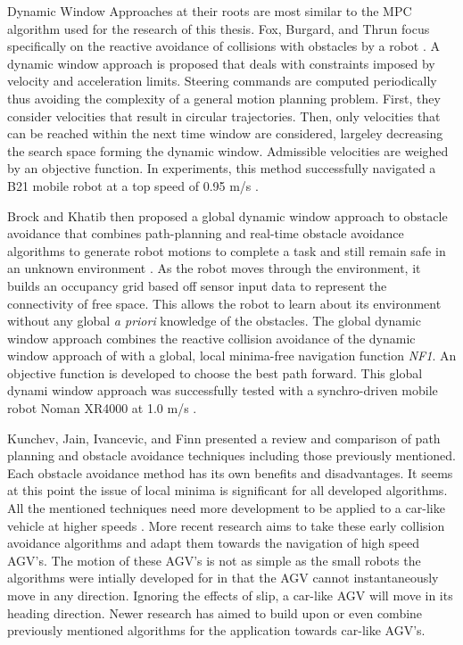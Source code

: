 \documentclass[12pt,onecolumn]{report}
\begin{document}
Dynamic Window Approaches at their roots are most similar to the MPC algorithm used for the research of this thesis. Fox, Burgard, and Thrun focus specifically on the reactive avoidance of collisions with obstacles by a robot \cite{Fox1997}. A dynamic window approach is proposed that deals with constraints imposed by velocity and acceleration limits. Steering commands are computed periodically thus avoiding the complexity of a general motion planning problem. First, they consider velocities that result in circular trajectories. Then, only velocities that can be reached within the next time window are considered, largeley decreasing the search space forming the dynamic window. Admissible velocities are weighed by an objective function. In experiments, this method successfully navigated a B21 mobile robot at a top speed of 0.95 m/s \cite{Fox1997}.

Brock and Khatib then proposed a global dynamic window approach to obstacle avoidance that combines path-planning and real-time obstacle avoidance algorithms to generate robot motions to complete a task and still remain safe in an unknown environment \cite{Brock&Khatib1999}. As the robot moves through the environment, it builds an occupancy grid based off sensor input data to represent the connectivity of free space. This allows the robot to learn about its environment without any global \textit{a priori} knowledge of the obstacles. The global dynamic window approach combines the reactive collision avoidance of the dynamic window approach of \cite{Fox1997} with a global, local minima-free navigation function \textit{NF1}. An objective function is developed to choose the best path forward. This global dynami window approach was successfully tested with a synchro-driven mobile robot Noman XR4000 at 1.0 m/s \cite{Brock&Khatib1999}.

Kunchev, Jain, Ivancevic, and Finn presented a review and comparison of path planning and obstacle avoidance techniques including those previously mentioned. Each obstacle avoidance method has its own benefits and disadvantages. It seems at this point the issue of local minima is significant for all developed algorithms. All the mentioned techniques need more development to be applied to a car-like vehicle at higher speeds \cite{Kunchev1999}. More recent research aims to take these early collision avoidance algorithms and adapt them towards the navigation of high speed AGV's. The motion of these AGV's is not as simple as the small robots the algorithms were intially developed for in that the AGV cannot instantaneously move in any direction. Ignoring the effects of slip, a car-like AGV will move in its heading direction. Newer research has aimed to build upon or even combine previously mentioned algorithms for the application towards car-like AGV's.
\end{document}
